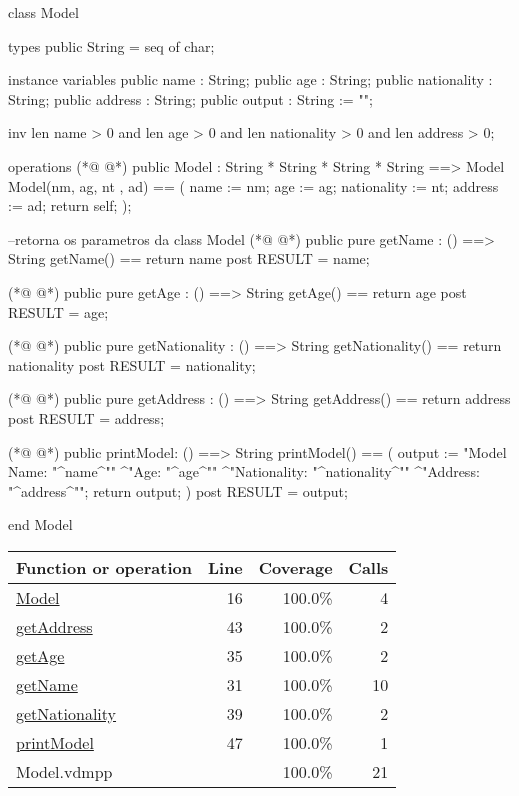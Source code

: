 \begin{vdmpp}[breaklines=true]
class Model

types
 public String = seq of char;
 
instance variables
 public name : String;
 public age : String;
 public nationality : String;
 public address : String;
 public output : String := "";
 
 inv len name > 0 and len age > 0 and len nationality > 0 and len address > 0;
 
 operations
(*@
\label{Model:16}
@*)
  public Model : 
          String * 
          String *
          String * 
          String ==> Model
  Model(nm, ag, nt , ad) ==
  (
    name := nm;
    age := ag;
    nationality := nt;
    address := ad;
    return self;
  );
  
  --retorna os parametros da class Model
(*@
\label{getName:31}
@*)
  public pure getName : () ==> String
    getName() == return name
    post RESULT = name;
    
(*@
\label{getAge:35}
@*)
   public pure getAge : () ==> String
     getAge() == return age
     post RESULT = age;
     
(*@
\label{getNationality:39}
@*)
  public pure getNationality : () ==> String
     getNationality() == return nationality
     post RESULT = nationality;
     
(*@
\label{getAddress:43}
@*)
  public pure getAddress : () ==> String
     getAddress() == return address 
  post RESULT = address;
  
(*@
\label{printModel:47}
@*)
  public printModel: () ==> String
  printModel() == (
  output := "Model Name: "^name^"\n"
       ^"Age: "^age^"\n"
       ^"Nationality: "^nationality^"\n"
       ^"Address: "^address^"\n";
  return output;
  )
  post RESULT = output;  
  
end Model
\end{vdmpp}
\bigskip
\begin{longtable}{|l|r|r|r|}
\hline
Function or operation & Line & Coverage & Calls \\
\hline
\hline
\hyperref[Model:16]{Model} & 16&100.0\% & 4 \\
\hline
\hyperref[getAddress:43]{getAddress} & 43&100.0\% & 2 \\
\hline
\hyperref[getAge:35]{getAge} & 35&100.0\% & 2 \\
\hline
\hyperref[getName:31]{getName} & 31&100.0\% & 10 \\
\hline
\hyperref[getNationality:39]{getNationality} & 39&100.0\% & 2 \\
\hline
\hyperref[printModel:47]{printModel} & 47&100.0\% & 1 \\
\hline
\hline
Model.vdmpp & & 100.0\% & 21 \\
\hline
\end{longtable}

